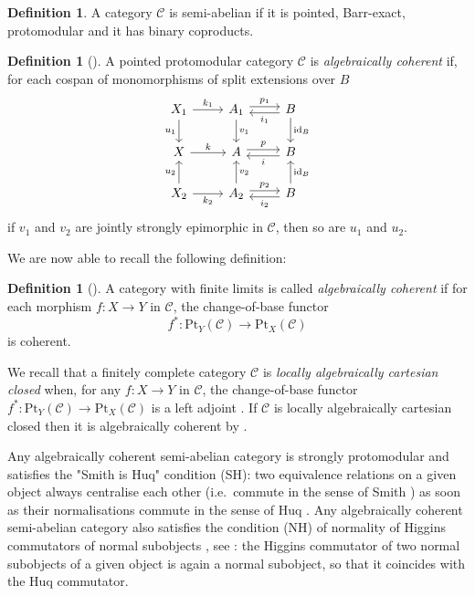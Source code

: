 \documentclass{amsart}
\theoremstyle{definition}
\newtheorem{definition}[theorem]{Definition}
\newcommand{\id}{\mathrm{id}}
\newenvironment{invisible}{{\noindent\sc \colorbox{yellow}{Invisible:}\;}\color{gray}}{\medskip}
\begin{document}
\begin{invisible}
\begin{definition}
A category $\mathcal{C}$ is semi-abelian if it is pointed, Barr-exact, protomodular and it has binary coproducts.
\end{definition}

\begin{definition}[\cite{CGvdL}]
 A pointed protomodular category $\mathcal{C}$ is \emph{algebraically coherent} if,
 for each cospan of monomorphisms of split extensions over $B$
 \[
 \begin{tikzcd}
   X_{1} \ar[r,"k_1"] \ar[d,"u_1"'] &
   A_1 \ar[r,shift left,"p_1"] \ar[d,"v_1"] &
   B \ar[d,"\id_B"] \ar[l,shift left,"i_1"] \\
   X \ar[r,"k"] &
   A \ar[r,shift left,"p"] &
   B \ar[l,shift left,"i"] \\
   X_{2} \ar[r,"k_2"'] \ar[u,"u_2"] &
   A_2 \ar[r,shift left,"p_2"] \ar[u,"v_2"'] &
   B \ar[u,"\id_B"'] \ar[l,shift left,"i_2"]
 \end{tikzcd}
 \]
 if $v_1$ and $v_2$ are jointly strongly epimorphic in $\mathcal{C}$,
 then so are $u_1$ and $u_2$.
 \end{definition}
\end{invisible}
We are now able to recall the following definition:
\begin{definition}[{\cite[Definition 3.1]{CGvdL}}]
 A category with finite limits is called \textit{algebraically coherent} if for each morphism $f:X\to Y$ in $\mathcal{C}$, the change-of-base functor
 \[
 f^{*}:\mathrm{Pt}_{Y}(\mathcal{C})\to\mathrm{Pt}_{X}(\mathcal{C})
 \]
 is coherent.
 \end{definition}

We recall that a finitely complete category $\mathcal{C}$ is \textit{locally algebraically cartesian closed} when, for any $f:X\to Y$ in $\mathcal{C}$, the change-of-base functor $f^{*}:\mathrm{Pt}_{Y}(\mathcal{C})\to\mathrm{Pt}_{X}(\mathcal{C})$ is a left adjoint \cite{BournGray}. If $\mathcal{C}$ is locally algebraically cartesian closed then it is algebraically coherent by \cite[Theorem 4.5]{CGvdL}.

Any algebraically coherent semi-abelian category is strongly protomodular \cite[Theorem 6.24]{CGvdL} and satisfies the "Smith is Huq" condition (SH): two equivalence relations on a given object always centralise each other (i.e.\ commute in the sense of Smith \cite{Smith,Pedicchio}) as soon as their normalisations commute in the sense of Huq \cite{Huq}. Any algebraically coherent semi-abelian category also satisfies the condition (NH) of normality of Higgins commutators of normal subobjects \cite{CigoliPhd,CGvdL2}, see \cite[Theorem 6.18]{CGvdL}: the Higgins commutator of two normal subobjects of a given object is again a normal subobject, so that it coincides with the Huq commutator. 
\end{document}
